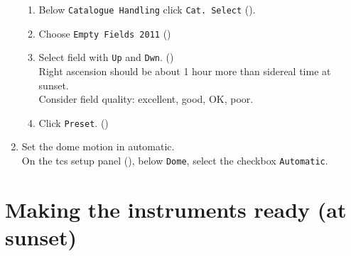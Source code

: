 \documentclass[11pt,fleqn,a4paper]{book}
\begin{document}
\begin{enumerate}
\begin{enumerate}
            \item Below \texttt{Catalogue Handling} click \texttt{Cat. Select} ().
            \item Choose \texttt{Empty Fields 2011} ()
            \item Select field with \texttt{Up} and \texttt{Dwn}. ()\\
                  Right ascension should be about 1 hour more than sidereal time at sunset.\\
                  Consider field quality: excellent, good, OK, poor.
            \item Click \texttt{Preset}. ()
            \end{enumerate}      
         \item Set the \gls{dome} motion in automatic.\label{list:domeauto}\\
               On the \gls{tcs} setup panel (), below \texttt{Dome}, select the checkbox \texttt{Automatic}.
\end{enumerate}


\section{Making the instruments ready (at sunset)}
\label{sec:insprep}
\end{document}
